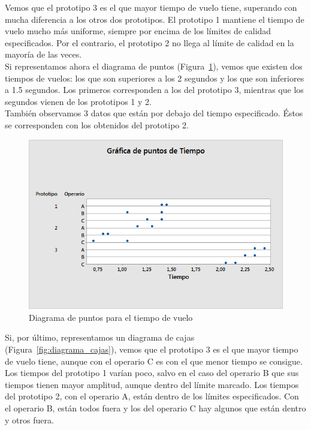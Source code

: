 \documentclass[12pt,a4paper,twoside,openright,titlepage,final]{article}
\begin{document}
Vemos que el prototipo 3 es el que mayor tiempo de vuelo tiene, superando con mucha diferencia a los otros dos prototipos. El prototipo 1 mantiene el tiempo de vuelo mucho más uniforme, siempre por encima de los límites de calidad especificados. Por el contrario, el prototipo 2 no llega al límite de calidad en la mayoría de las veces.\\

Si representamos ahora el diagrama de puntos (Figura~\ref{fig:diagrama_puntos}), vemos que existen dos tiempos de vuelos: los que son superiores a los 2 segundos y los que son inferiores a 1.5 segundos. Los primeros corresponden a los del prototipo 3, mientras que los segundos vienen de los prototipos 1 y 2.\\

También observamos 3 datos que están por debajo del tiempo especificado. Éstos se corresponden con los obtenidos del prototipo 2.\\ 

\begin{figure}[htbp!]
	\centering
	\includegraphics[width=0.7\linewidth]{imagenes/Grafica_de_puntos_de_Tiempo}
	\caption{Diagrama de puntos para el tiempo de vuelo}
	\label{fig:diagrama_puntos}
\end{figure}

Si, por último, representamos un diagrama de cajas (Figura~\ref{fig:diagrama_cajas}), vemos que el prototipo 3 es el que mayor tiempo de vuelo tiene, aunque con el operario C es con el que menor tiempo se consigue. Los tiempos del prototipo 1 varían poco, salvo en el caso del operario B que sus tiempos tienen mayor amplitud, aunque dentro del límite marcado. Los tiempos del prototipo 2, con el operario A, están dentro de los límites especificados. Con el operario B, están todos fuera y los del operario C hay algunos que están dentro y otros fuera. 
\end{document}
